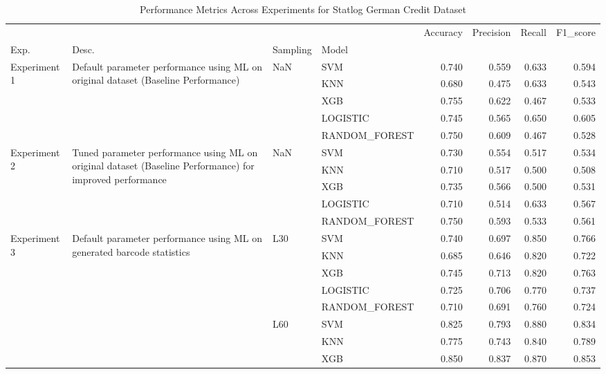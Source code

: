 \begin{table}
\caption{Performance Metrics Across Experiments for Statlog German Credit Dataset}
\label{tab:results for Statlog German Credit Dataset}
\begin{tabular}{llllrrrr}
\toprule
 &  &  &  & Accuracy & Precision & Recall & F1\_score \\
Exp. & Desc. & Sampling & Model &  &  &  &  \\
\midrule
\multirow[t]{5}{*}{Experiment 1} & \multirow[t]{5}{*}{Default parameter performance using ML on original dataset (Baseline Performance)} & \multirow[t]{5}{*}{NaN} & SVM & 0.740 & 0.559 & 0.633 & 0.594 \\
 &  &  & KNN & 0.680 & 0.475 & 0.633 & 0.543 \\
 &  &  & XGB & 0.755 & 0.622 & 0.467 & 0.533 \\
 &  &  & LOGISTIC & 0.745 & 0.565 & 0.650 & 0.605 \\
 &  &  & RANDOM\_FOREST & 0.750 & 0.609 & 0.467 & 0.528 \\
\cline{1-8} \cline{2-8} \cline{3-8}
\multirow[t]{5}{*}{Experiment 2} & \multirow[t]{5}{*}{Tuned parameter performance using ML on original dataset (Baseline Performance) for improved performance} & \multirow[t]{5}{*}{NaN} & SVM & 0.730 & 0.554 & 0.517 & 0.534 \\
 &  &  & KNN & 0.710 & 0.517 & 0.500 & 0.508 \\
 &  &  & XGB & 0.735 & 0.566 & 0.500 & 0.531 \\
 &  &  & LOGISTIC & 0.710 & 0.514 & 0.633 & 0.567 \\
 &  &  & RANDOM\_FOREST & 0.750 & 0.593 & 0.533 & 0.561 \\
\cline{1-8} \cline{2-8} \cline{3-8}
\multirow[t]{10}{*}{Experiment 3} & \multirow[t]{10}{*}{Default parameter performance using ML on generated barcode statistics} & \multirow[t]{5}{*}{L30} & SVM & 0.740 & 0.697 & 0.850 & 0.766 \\
 &  &  & KNN & 0.685 & 0.646 & 0.820 & 0.722 \\
 &  &  & XGB & 0.745 & 0.713 & 0.820 & 0.763 \\
 &  &  & LOGISTIC & 0.725 & 0.706 & 0.770 & 0.737 \\
 &  &  & RANDOM\_FOREST & 0.710 & 0.691 & 0.760 & 0.724 \\
\cline{3-8}
 &  & \multirow[t]{5}{*}{L60} & SVM & 0.825 & 0.793 & 0.880 & 0.834 \\
 &  &  & KNN & 0.775 & 0.743 & 0.840 & 0.789 \\
 &  &  & XGB & 0.850 & 0.837 & 0.870 & 0.853 \\

\end{tabular}
\end{table}
